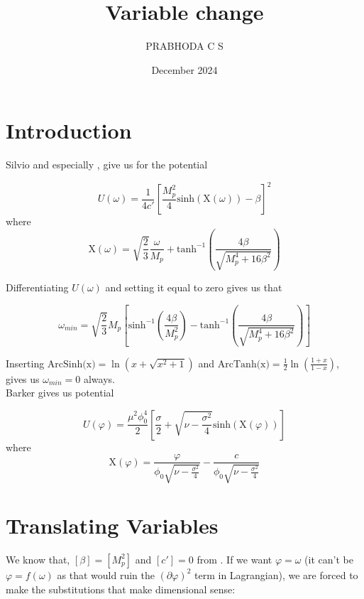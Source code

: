\documentclass{article}
\title{Variable change}
\author{PRABHODA C S}
\date{December 2024}
\begin{document}
\maketitle

\section{Introduction}  \label{Section 1}
Silvio \cite{Salvio_2022} and especially \cite{Pradisi_2022}, give us for the potential

\begin{equation}
    U(\omega) = \frac{1}{4 c'} \left[ \frac{M_{p}^{2}}{4} \text{sinh}(\text{X}(\omega)) - \beta  \right]^2
\end{equation}
where
\begin{equation}
    \text{X}(\omega) = \sqrt{\frac{2}{3}} \frac{\omega}{M_{p}} + \text{tanh}^{-1} \left(\frac{4 \beta}{\sqrt{M_{p}^{4}+16 \beta^2}} \right)
\end{equation}

Differentiating $U(\omega)$ and setting it equal to zero gives us that 

\begin{equation}
    \omega_{min} = \sqrt{\frac{2}{3}} M_p \left[ \text{sinh}^{-1}\left(\frac{4\beta}{M_{p}^{2}}\right) - \text{tanh}^{-1}\left(\frac{4\beta}{\sqrt{M_{p}^{4} + 16\beta^2}}\right) \right]
\end{equation}

Inserting $\text{ArcSinh(x)} = \ln(x + \sqrt{x^2 + 1})$ and $\text{ArcTanh(x)} = \frac{1}{2} \ln\left(\frac{1+x}{1-x}\right)$, gives us $\omega_{min} = 0$ always.
\\
Barker \cite{barker2024poincaregaugetheoryconformal} gives us potential

\begin{equation}
    U(\varphi) = \frac{\mu^2 \phi_{0}^{4}}{2} \left[ \frac{\sigma}{2} + \sqrt{\nu - \frac{\sigma^2}{4}} \text{sinh}\left( \text{X}(\varphi) \right)  \right]
\end{equation}
where
\begin{equation}
    \text{X}(\varphi) =  \frac{\varphi}{\phi_0 \sqrt{\nu - \frac{\sigma^2}{4}}} - \frac{c}{\phi_0 \sqrt{\nu - \frac{\sigma^2}{4}}}
\end{equation}

\section{Translating Variables}   \label{Section 2}
We know that, $[\beta] = [M_{p}^{2}]$  and $[c'] = 0$ from \cite{Pradisi_2022}. If we want $\varphi = \omega$ (it can't be $\varphi = f(\omega)$ as that would ruin the $(\partial\varphi)^2$ term in Lagrangian), we are forced to make the substitutions that make dimensional sense:
\end{document}
